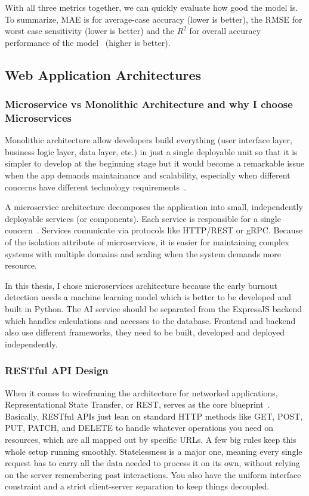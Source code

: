 \documentclass[12pt,a4paper]{article}
\begin{document}
With all three metrics together, we can quickly evaluate how good the model is. To summarize, MAE is for average-case accuracy (lower is better), the RMSE for worst case sensitivity (lower is better) and the $R^{2}$ for overall accuracy performance of the model~\cite{hastie2009} (higher is better).

\subsection{Web Application Architectures}

\subsubsection{Microservice vs Monolithic Architecture and why I choose Microservices}

Monolithic architecture allow developers build everything (user interface layer, business logic layer, data layer, etc.) in just a single deployable unit so that it is simpler to develop at the beginning stage but it would become a remarkable issue when the app demands maintainance and scalability, especially when different concerns have different technology requirements~\cite{newman2015}.

A microservice architecture decomposes the application into small, independently deployable services (or components). Each service is responsible for a single concern~\cite{newman2015}. Services comunicate via protocols like HTTP/REST or gRPC. Because of the isolation attribute of microservices, it is easier for maintaining complex systems with multiple domains and scaling when the system demands more resource.

In this thesis, I chose microservices architecture because the early burnout detection needs a machine learning model which is better to be developed and built in Python. The AI service should be separated from the ExpressJS backend which handles calculations and accesses to the database. Frontend and backend also use different frameworks, they need to be built, developed and deployed independently.

\subsubsection{RESTful API Design}

When it comes to wireframing the architecture for networked applications, Representational State Transfer, or REST, serves as the core blueprint~\cite{fielding2000}. Basically, RESTful APIs just lean on standard HTTP methods like GET, POST, PUT, PATCH, and DELETE to handle whatever operations you need on resources, which are all mapped out by specific URLs. A few big rules keep this whole setup running smoothly. Statelessness is a major one, meaning every single request has to carry all the data needed to process it on its own, without relying on the server remembering past interactions. You also have the uniform interface constraint and a strict client-server separation to keep things decoupled.
\end{document}
